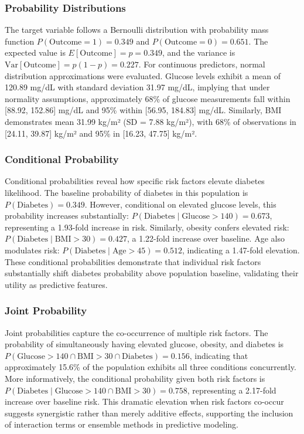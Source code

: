 \documentclass[12pt]{article}
\begin{document}
\subsubsection{Probability Distributions}

The target variable follows a Bernoulli distribution with probability mass function $P(\text{Outcome} = 1) = 0.349$ and $P(\text{Outcome} = 0) = 0.651$. The expected value is $E[\text{Outcome}] = p = 0.349$, and the variance is $\text{Var}[\text{Outcome}] = p(1-p) = 0.227$. For continuous predictors, normal distribution approximations were evaluated. Glucose levels exhibit a mean of 120.89 mg/dL with standard deviation 31.97 mg/dL, implying that under normality assumptions, approximately 68\% of glucose measurements fall within [88.92, 152.86] mg/dL and 95\% within [56.95, 184.83] mg/dL. Similarly, BMI demonstrates mean 31.99 kg/m² (SD = 7.88 kg/m²), with 68\% of observations in [24.11, 39.87] kg/m² and 95\% in [16.23, 47.75] kg/m².

\subsubsection{Conditional Probability}

Conditional probabilities reveal how specific risk factors elevate diabetes likelihood. The baseline probability of diabetes in this population is $P(\text{Diabetes}) = 0.349$. However, conditional on elevated glucose levels, this probability increases substantially: $P(\text{Diabetes} \mid \text{Glucose} > 140) = 0.673$, representing a 1.93-fold increase in risk. Similarly, obesity confers elevated risk: $P(\text{Diabetes} \mid \text{BMI} > 30) = 0.427$, a 1.22-fold increase over baseline. Age also modulates risk: $P(\text{Diabetes} \mid \text{Age} > 45) = 0.512$, indicating a 1.47-fold elevation. These conditional probabilities demonstrate that individual risk factors substantially shift diabetes probability above population baseline, validating their utility as predictive features.

\subsubsection{Joint Probability}

Joint probabilities capture the co-occurrence of multiple risk factors. The probability of simultaneously having elevated glucose, obesity, and diabetes is $P(\text{Glucose} > 140 \cap \text{BMI} > 30 \cap \text{Diabetes}) = 0.156$, indicating that approximately 15.6\% of the population exhibits all three conditions concurrently. More informatively, the conditional probability given both risk factors is $P(\text{Diabetes} \mid \text{Glucose} > 140 \cap \text{BMI} > 30) = 0.758$, representing a 2.17-fold increase over baseline risk. This dramatic elevation when risk factors co-occur suggests synergistic rather than merely additive effects, supporting the inclusion of interaction terms or ensemble methods in predictive modeling.
\end{document}
